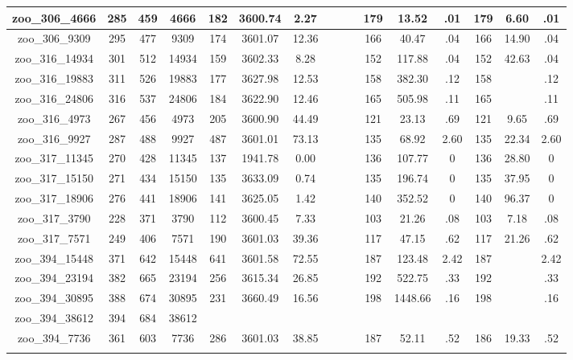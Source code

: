 \begin{landscape}
\begin{longtable}{|c|c|c|c|c|c|c|c|c|c|c|c|c|c|c|c|}
zoo\_306\_4666 & 285 & 459 & 4666 & 182 & 3600.74 & 2.27 &  &  &  & 179 & 13.52 & .01 & 179 & 6.60 & .01 \\ \hline 
zoo\_306\_9309 & 295 & 477 & 9309 & 174 & 3601.07 & 12.36 &  &  &  & 166 & 40.47 & .04 & 166 & 14.90 & .04 \\ \hline 
zoo\_316\_14934 & 301 & 512 & 14934 & 159 & 3602.33 & 8.28 &  &  &  & 152 & 117.88 & .04 & 152 & 42.63 & .04 \\ \hline 
zoo\_316\_19883 & 311 & 526 & 19883 & 177 & 3627.98 & 12.53 &  &  &  & 158 & 382.30 & .12 & 158 &  & .12 \\ \hline 
zoo\_316\_24806 & 316 & 537 & 24806 & 184 & 3622.90 & 12.46 &  &  &  & 165 & 505.98 & .11 & 165 &  & .11 \\ \hline 
zoo\_316\_4973 & 267 & 456 & 4973 & 205 & 3600.90 & 44.49 &  &  &  & 121 & 23.13 & .69 & 121 & 9.65 & .69 \\ \hline 
zoo\_316\_9927 & 287 & 488 & 9927 & 487 & 3601.01 & 73.13 &  &  &  & 135 & 68.92 & 2.60 & 135 & 22.34 & 2.60 \\ \hline 
zoo\_317\_11345 & 270 & 428 & 11345 & 137 & 1941.78 & 0.00 &  &  &  & 136 & 107.77 & 0 & 136 & 28.80 & 0 \\ \hline 
zoo\_317\_15150 & 271 & 434 & 15150 & 135 & 3633.09 & 0.74 &  &  &  & 135 & 196.74 & 0 & 135 & 37.95 & 0 \\ \hline 
zoo\_317\_18906 & 276 & 441 & 18906 & 141 & 3625.05 & 1.42 &  &  &  & 140 & 352.52 & 0 & 140 & 96.37 & 0 \\ \hline 
zoo\_317\_3790 & 228 & 371 & 3790 & 112 & 3600.45 & 7.33 &  &  &  & 103 & 21.26 & .08 & 103 & 7.18 & .08 \\ \hline 
zoo\_317\_7571 & 249 & 406 & 7571 & 190 & 3601.03 & 39.36 &  &  &  & 117 & 47.15 & .62 & 117 & 21.26 & .62 \\ \hline 
zoo\_394\_15448 & 371 & 642 & 15448 & 641 & 3601.58 & 72.55 &  &  &  & 187 & 123.48 & 2.42 & 187 &  & 2.42 \\ \hline 
zoo\_394\_23194 & 382 & 665 & 23194 & 256 & 3615.34 & 26.85 &  &  &  & 192 & 522.75 & .33 & 192 &  & .33 \\ \hline 
zoo\_394\_30895 & 388 & 674 & 30895 & 231 & 3660.49 & 16.56 &  &  &  & 198 & 1448.66 & .16 & 198 &  & .16 \\ \hline 
zoo\_394\_38612 & 394 & 684 & 38612 &  &  &  &  &  &  &  &  &  &  &  &  \\ \hline 
zoo\_394\_7736 & 361 & 603 & 7736 & 286 & 3601.03 & 38.85 &  &  &  & 187 & 52.11 & .52 & 186 & 19.33 & .52 \\ \hline 
\label{tbl:results}
\end{longtable}
\end{landscape}
